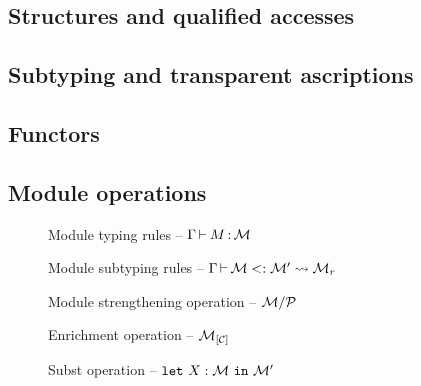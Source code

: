 \subsection{Structures and qualified accesses}

\subsection{Subtyping and transparent ascriptions}

\subsection{Functors}

\subsection{Module operations}

\begin{figure}[tbp]
  \vspace{-3mm}
  \caption{Module typing rules -- $\Gamma \operatorname{\vdash}_{} M \operatorname{:} \mathcal M$}
  \label{module:typing}
\end{figure}

\begin{figure}[tbp]
  \vspace{-3mm}
  \caption{Module subtyping rules -- $\Gamma \operatorname{\vdash} \mathcal M <: \mathcal M' \leadsto \mathcal M_r$}
  \label{module:subtyping}
\end{figure}

\begin{figure}[tbp]
  
  \caption{Module strengthening operation -- $\mathcal M/\mathcal P$}
  \label{module:strengthen}
\end{figure}

\begin{figure}[tbp]
  
  \caption{Enrichment operation -- ${\mathcal M}_{\left[\mathcal C\right]}$}
  \label{module:enrich}
\end{figure}

\begin{figure}[tbp]
  
  \caption{Subst operation -- $\mathtt{let}\ X : \mathcal M\ \mathtt{in}\ \mathcal M'$}
  \label{module:subst}
\end{figure}

